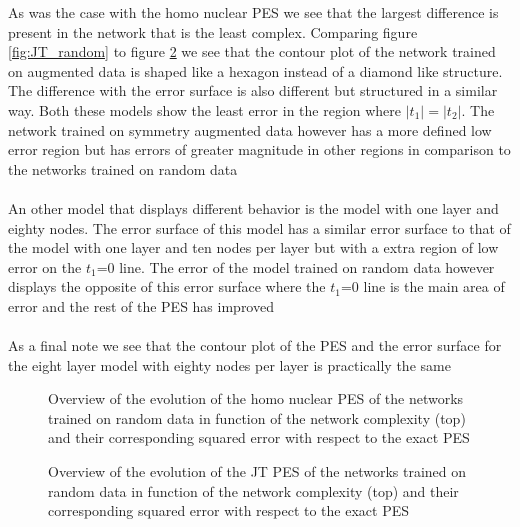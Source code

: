 \documentclass[12pt]{article}
\begin{document}
As was the case with the homo nuclear PES we see that the largest difference is present in the network that is the least complex. Comparing figure \ref{fig:JT_random} to figure \ref{fig:JTaug} we see that the contour plot of the network trained on augmented data is shaped like a hexagon instead of a diamond like structure. The difference with the error surface is also different but structured in a similar way. Both these models show the least error in the region where $\lvert t_1 \rvert = \lvert t_2 \rvert$. The network trained on symmetry augmented data however has a more defined low error region but has errors of greater magnitude in other regions in comparison to the networks trained on random data
\\
\\
An other model that displays different behavior is the model with one layer and eighty nodes. The error surface of this model has a similar error surface to that of the model with one layer and ten nodes per layer but with a extra region of low error on the $t_1$=0 line. The error of the model trained on random data however displays the opposite of this error surface where the $t_1$=0 line is the main area of error and the rest of the PES has improved 
\\
\\
As a final note we see that the contour plot of the PES and the error surface for the eight layer model with eighty nodes per layer is practically the same
\begin{figure}[H]
	\centering
	\begin{subfigure}
		\texttt{[image: "Linear\_PES\_nfac"]}
	\end{subfigure}
	\begin{subfigure}
		\texttt{[image: "Linear\_PES\_MSE\_nfac"]}
	\end{subfigure}
	\caption{Overview of the evolution of the homo nuclear PES of the networks trained on random data in function of the network complexity (top) and their corresponding squared error with respect to the exact PES}
	\label{fig:PESaug}
\end{figure}
\begin{figure}
	\centering
	\begin{subfigure}
		\texttt{[image: "Linear\_JT\_nfac"]}
	\end{subfigure}
	\begin{subfigure}
		\texttt{[image: "Linear\_JT\_MSE\_nfac"]}
	\end{subfigure}
	\caption{Overview of the evolution of the JT PES of the networks trained on random data in function of the network complexity (top) and their corresponding squared error with respect to the exact PES}
	\label{fig:JTaug}	
\end{figure}
\newpage
\end{document}
